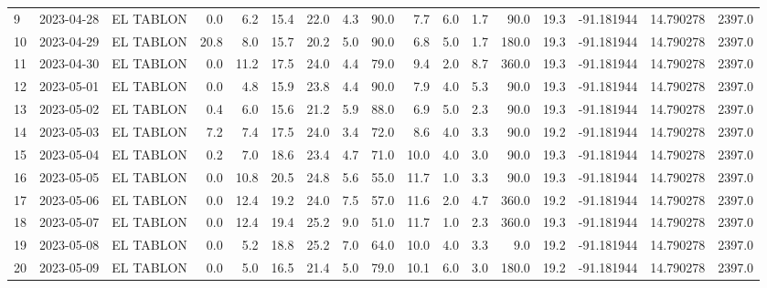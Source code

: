 \documentclass[12pt]{article}
\begin{document}
\begin{center}
\begin{tabular}{lllrrrrrrrrrrrrrr}
9   & 2023-04-28 &  EL TABLON &     0.0 &   6.2 &   15.4 &  22.0 &      4.3 &     90.0 &        7.7 &  6.0 &         1.7 &        90.0 &        19.3 & -91.181944 &  14.790278 &   2397.0 \\
10  & 2023-04-29 &  EL TABLON &    20.8 &   8.0 &   15.7 &  20.2 &      5.0 &     90.0 &        6.8 &  5.0 &         1.7 &       180.0 &        19.3 & -91.181944 &  14.790278 &   2397.0 \\
11  & 2023-04-30 &  EL TABLON &     0.0 &  11.2 &   17.5 &  24.0 &      4.4 &     79.0 &        9.4 &  2.0 &         8.7 &       360.0 &        19.3 & -91.181944 &  14.790278 &   2397.0 \\
12  & 2023-05-01 &  EL TABLON &     0.0 &   4.8 &   15.9 &  23.8 &      4.4 &     90.0 &        7.9 &  4.0 &         5.3 &        90.0 &        19.3 & -91.181944 &  14.790278 &   2397.0 \\
13  & 2023-05-02 &  EL TABLON &     0.4 &   6.0 &   15.6 &  21.2 &      5.9 &     88.0 &        6.9 &  5.0 &         2.3 &        90.0 &        19.3 & -91.181944 &  14.790278 &   2397.0 \\
14  & 2023-05-03 &  EL TABLON &     7.2 &   7.4 &   17.5 &  24.0 &      3.4 &     72.0 &        8.6 &  4.0 &         3.3 &        90.0 &        19.2 & -91.181944 &  14.790278 &   2397.0 \\
15  & 2023-05-04 &  EL TABLON &     0.2 &   7.0 &   18.6 &  23.4 &      4.7 &     71.0 &       10.0 &  4.0 &         3.0 &        90.0 &        19.3 & -91.181944 &  14.790278 &   2397.0 \\
16  & 2023-05-05 &  EL TABLON &     0.0 &  10.8 &   20.5 &  24.8 &      5.6 &     55.0 &       11.7 &  1.0 &         3.3 &        90.0 &        19.3 & -91.181944 &  14.790278 &   2397.0 \\
17  & 2023-05-06 &  EL TABLON &     0.0 &  12.4 &   19.2 &  24.0 &      7.5 &     57.0 &       11.6 &  2.0 &         4.7 &       360.0 &        19.2 & -91.181944 &  14.790278 &   2397.0 \\
18  & 2023-05-07 &  EL TABLON &     0.0 &  12.4 &   19.4 &  25.2 &      9.0 &     51.0 &       11.7 &  1.0 &         2.3 &       360.0 &        19.3 & -91.181944 &  14.790278 &   2397.0 \\
19  & 2023-05-08 &  EL TABLON &     0.0 &   5.2 &   18.8 &  25.2 &      7.0 &     64.0 &       10.0 &  4.0 &         3.3 &         9.0 &        19.2 & -91.181944 &  14.790278 &   2397.0 \\
20  & 2023-05-09 &  EL TABLON &     0.0 &   5.0 &   16.5 &  21.4 &      5.0 &     79.0 &       10.1 &  6.0 &         3.0 &       180.0 &        19.2 & -91.181944 &  14.790278 &   2397.0 \\

\end{tabular}
\end{center}
\end{document}
